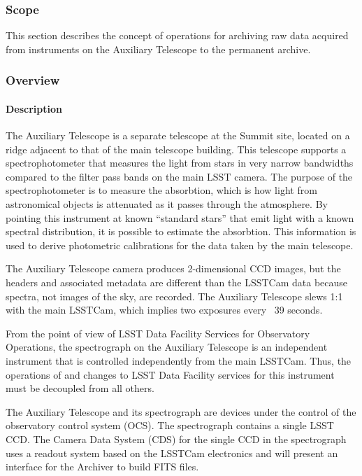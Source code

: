 ﻿\subsubsection{Scope}

This section describes the concept of operations for archiving raw data acquired 
from instruments on the Auxiliary Telescope to the permanent archive.

\subsubsection{Overview}

\paragraph{Description}

The Auxiliary Telescope is a separate telescope at the Summit site, located on a 
ridge adjacent to that of the main telescope building. This telescope supports a 
spectrophotometer that measures the light from stars in very narrow bandwidths 
compared to the filter pass bands on the main LSST camera. The purpose of the 
spectrophotometer is to measure the absorbtion, which is how light from astronomical 
objects is attenuated as it passes through the atmosphere. By pointing this instrument 
at known “standard stars” that emit light with a known spectral distribution, it is 
possible to estimate the absorbtion. This information is used to derive photometric 
calibrations for the data taken by the main telescope. 

The Auxiliary Telescope camera produces 2-dimensional CCD images, but the headers 
and associated metadata are different than the LSSTCam data because spectra, not 
images of the sky, are recorded. The Auxiliary Telescope slews 1:1 with the main LSSTCam, 
which implies two exposures every ~39 seconds.

From the point of view of LSST Data Facility Services for Observatory Operations, the 
spectrograph on the Auxiliary Telescope is an independent instrument that is controlled 
independently from the main LSSTCam. Thus, the operations of and changes to LSST 
Data Facility services for this instrument must be decoupled from all others.

The Auxiliary Telescope and its spectrograph are devices under the
control of the observatory control system (OCS). The spectrograph
contains a single LSST CCD. The Camera Data System (CDS) for the single CCD in the 
spectrograph uses a readout system based on the LSSTCam electronics and will
present an interface for the Archiver to build FITS files.


